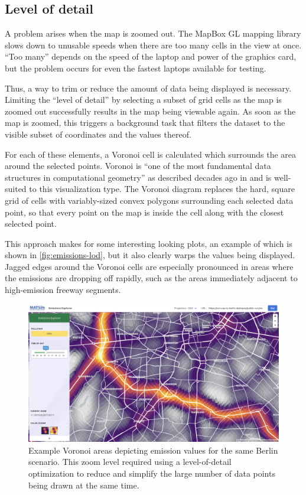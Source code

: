 \hypertarget{server-experiments-emissions-lod}{%
\subsection{Level of detail}
\label{server-experiments-emissions-lod}}

A problem arises when the map is zoomed out. The MapBox GL mapping library slows down to unusable speeds when there are too many cells in the view at once. ``Too many'' depends on the speed of the laptop and power of the graphics card, but the problem occurs for even the fastest laptops available for testing.

Thus, a way to trim or reduce the amount of data being displayed is necessary. Limiting the ``level of detail'' by selecting a subset of grid cells as the map is zoomed out successfully results in the map being viewable again. As soon as the map is zoomed, this triggers a background task that filters the dataset to the visible subset of coordinates and the values thereof.

For each of these elements, a Voronoi cell is calculated which surrounds the area around the selected points. Voronoi is ``one of the most fundamental data structures in computational geometry'' as described decades ago in \cite{aurenhammer1991voronoi} and is well-suited to this visualization type. The Voronoi diagram replaces the hard, square grid of cells with variably-sized convex polygons surrounding each selected data point, so that every point on the map is inside the cell along with the closest selected point.

This approach makes for some interesting looking plots, an example of which is shown in \autoref{fig:emissions-lod}, but it also clearly warps the values being displayed. Jagged edges around the Voronoi cells are especially pronounced in areas where the emissions are dropping off rapidly, such as the areas immediately adjacent to high-emission freeway segments.

\begin{figure}[!ht]
  \includegraphics[width=\textwidth]{chapters/12-server-experiments/images/emissions-lod.png}
  \caption[Example Voronoi areas depicting emission values for a Berlin scenario]{Example Voronoi areas depicting emission values for the same Berlin scenario. This zoom level required using a level-of-detail optimization to reduce and simplify the large number of data points being drawn at the same time.}
  \label{fig:emissions-lod}
\end{figure}

